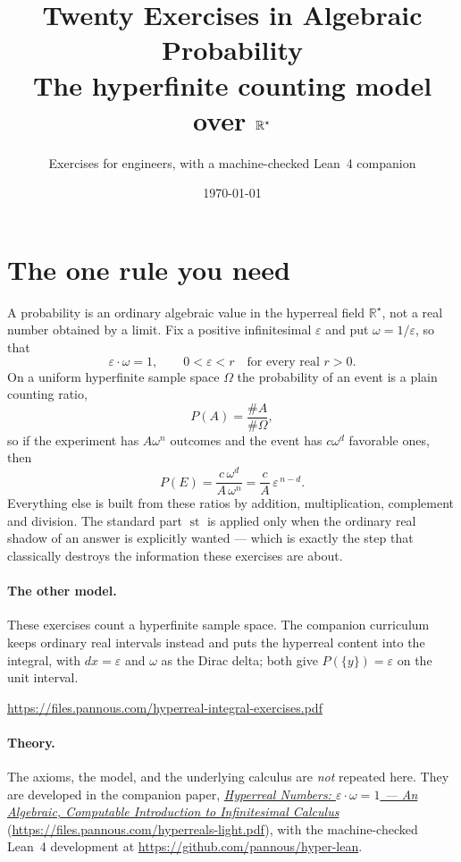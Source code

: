 \documentclass[11pt]{article}
\title{Twenty Exercises in Algebraic Probability\\
\large The hyperfinite counting model over $\Rstar$}
\author{Exercises for engineers, with a machine-checked Lean~4 companion}
\date{\today}
\newcommand{\Rstar}{\mathbb{R}^{\star}}
\newcommand{\eps}{\varepsilon}
\newcommand{\st}{\operatorname{st}}
\begin{document}
\maketitle


\section*{The one rule you need}

A probability is an ordinary algebraic value in the hyperreal field $\Rstar$,
not a real number obtained by a limit. Fix a positive infinitesimal $\eps$ and
put $\omega = 1/\eps$, so that
\[
  \eps \cdot \omega = 1,
  \qquad 0 < \eps < r \quad\text{for every real } r > 0 .
\]
On a uniform hyperfinite sample space $\Omega$ the probability of an event is a
plain counting ratio,
\[
  P(A) = \frac{\#A}{\#\Omega},
\]
so if the experiment has $A\omega^{n}$ outcomes and the event has $c\omega^{d}$
favorable ones, then
\[
  P(E) = \frac{c\,\omega^{d}}{A\,\omega^{n}} = \frac{c}{A}\,\eps^{\,n-d}.
\]
Everything else is built from these ratios by addition, multiplication,
complement and division. The standard part $\st$ is applied only when the
ordinary real shadow of an answer is explicitly wanted --- which is exactly the
step that classically destroys the information these exercises are about.

\paragraph{The other model.} These exercises count a hyperfinite sample space.
The companion curriculum keeps ordinary real intervals instead and puts the
hyperreal content into the integral, with $dx=\eps$ and $\omega$ as the Dirac
delta; both give $P(\{y\})=\eps$ on the unit interval.
\begin{center}\small\url{https://files.pannous.com/hyperreal-integral-exercises.pdf}\end{center}

\paragraph{Theory.} The axioms, the model, and the underlying calculus are
\emph{not} repeated here. They are developed in the companion paper,
\href{https://files.pannous.com/hyperreals-light.pdf}{\emph{Hyperreal Numbers: $\eps\cdot\omega=1$ --- An
Algebraic, Computable Introduction to Infinitesimal Calculus}}
(\url{https://files.pannous.com/hyperreals-light.pdf}), with the machine-checked Lean~4 development at
\url{https://github.com/pannous/hyper-lean}.
\end{document}
